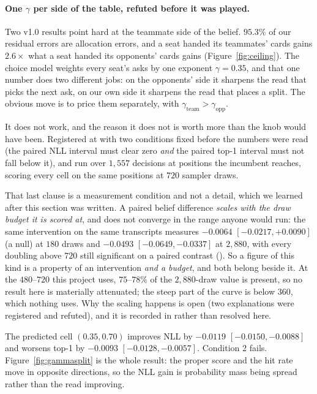 \documentclass[11pt,letterpaper]{article}
\begin{document}
\paragraph{One $\gamma$ per side of the table, refuted before it was played.}
Two v1.0 results point hard at the teammate side of the belief. $95.3\%$ of our
residual errors are allocation errors, and a seat handed its teammates' cards
gains $2.6\times$ what a seat handed its opponents' cards gains
(Figure~\ref{fig:ceiling}). The choice model weights every seat's asks by one
exponent $\gamma = 0.35$, and that one number does two different jobs: on the
opponents' side it sharpens the read that picks the next ask, on our own side it
sharpens the read that places a split. The obvious move is to price them
separately, with $\gamma_{\mathrm{team}} > \gamma_{\mathrm{opp}}$.

It does not work, and the reason it does not is worth more than the knob would
have been. Registered at  with two conditions fixed
before the numbers were read (the paired NLL interval must clear zero
\emph{and} the paired top-1 interval must not fall below it), and run over
$1{,}557$ decisions at positions the incumbent reaches, scoring every cell on
the same positions at $720$ sampler draws.

That last clause is a measurement condition and not a detail, which we learned
after this section was written. A paired belief difference \emph{scales with the
draw budget it is scored at}, and does not converge in the range anyone would
run: the same intervention on the same transcripts measures $-0.0064$
$[-0.0217, +0.0090]$ (a null) at $180$ draws and $-0.0493$
$[-0.0649, -0.0337]$ at $2{,}880$, with every doubling above $720$ still
significant on a paired contrast
(). So a figure of this kind is a
property of an intervention \emph{and a budget}, and both belong beside it. At
the $480$--$720$ this project uses, $75$--$78\%$ of the $2{,}880$-draw value is
present, so no result here is materially attenuated; the steep part of the curve
is below $360$, which nothing uses. Why the scaling happens is open (two
explanations were registered and refuted), and it is recorded in
 rather than resolved here.

The predicted cell $(0.35, 0.70)$ improves NLL by $-0.0119$
$[-0.0150, -0.0088]$ and worsens top-1 by $-0.0093$ $[-0.0128, -0.0057]$.
Condition 2 fails. Figure~\ref{fig:gammasplit} is the whole result: the proper
score and the hit rate move in opposite directions, so the NLL gain is
probability mass being spread rather than the read improving.
\end{document}
